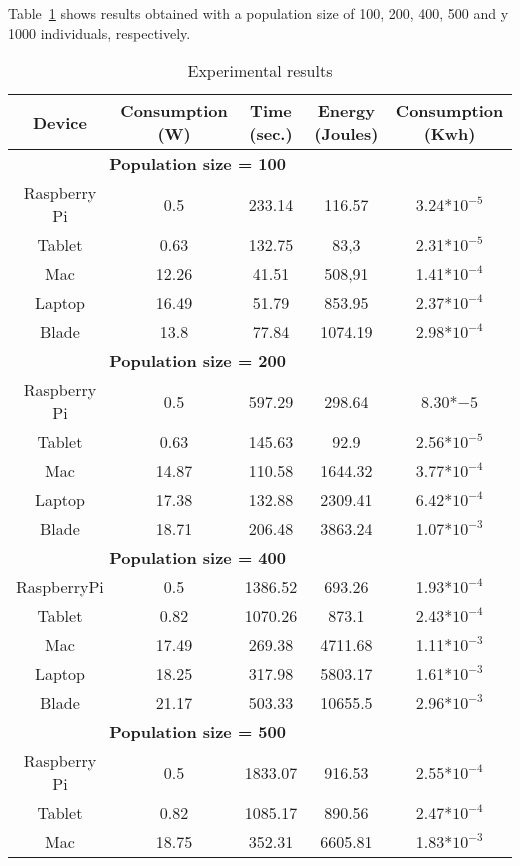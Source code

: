Table~\ref{Table:result_todos} shows results obtained with a population size of 100, 200, 400, 500 and y 1000 individuals, respectively. 
\begin{small}
 
\begin{table}[!ht]
\renewcommand{\arraystretch}{1.3}
\centering
\caption{Experimental results}
\label{Table:result_todos}
\begin{tabular}{ccccc} \hline
Device & Consumption (W) & Time (sec.) & Energy (Joules) & Consumption (Kwh) \\ \hline
\multicolumn{4}{c}{\textbf{Population size = 100}}\\ %
Raspberry Pi & 0.5 & 233.14 &116.57 & 3.24*$10^{-5}$ \\
Tablet & 0.63 & 132.75 & 83,3&2.31*$10^{-5}$ \\
Mac & 12.26 & 41.51 & 508,91&1.41*$10^{-4}$ \\
Laptop & 16.49 & 51.79 & 853.95& 2.37*$10^{-4}$ \\
Blade & 13.8 & 77.84 & 1074.19&2.98*$10^{-4}$ \\ \hline
\multicolumn{4}{c}{\textbf{Population size = 200}}\\ %
Raspberry Pi &	0.5 &597.29 &298.64 & 8.30*${-5}$ \\
Tablet & 0.63 & 145.63 & 92.9&2.56*$10^{-5}$ \\
Mac & 14.87 & 110.58 & 1644.32&3.77*$10^{-4}$ \\
Laptop	& 17.38 & 132.88 & 2309.41&6.42*$10^{-4}$ \\
Blade & 18.71 & 206.48 & 3863.24&1.07*$10^{-3}$ \\ \hline
\multicolumn{4}{c}{\textbf{Population size = 400}}\\ %
 RaspberryPi&0.5&1386.52& 693.26&1.93*$10^{-4}$ \\
Tablet &0.82&1070.26& 873.1&2.43*$10^{-4}$\\
Mac&17.49&269.38&4711.68&1.11*$10^{-3}$\\
Laptop&18.25&317.98&5803.17 &1.61*$10^{-3}$\\
Blade&21.17&503.33&10655.5&2.96*$10^{-3}$ \\ \hline
\multicolumn{4}{c}{\textbf{Population size = 500}}\\ %
Raspberry Pi & 0.5&1833.07&916.53 &2.55*$10^{-4}$ \\
Tablet & 0.82 & 1085.17& 890.56&2.47*$10^{-4}$ \\
Mac & 18.75 & 352.31 & 6605.81&1.83*$10^{-3}$ \\

\end{tabular}
\end{table}
\end{small}
